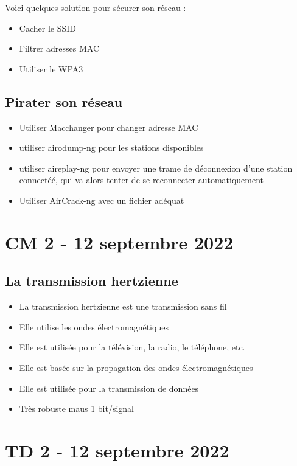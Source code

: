 \documentclass[12pt, a4paper]{article}
\begin{document}
Voici quelques solution pour sécurer son réseau : \\
\begin{itemize}
    \item Cacher le SSID
    \item Filtrer adresses MAC
    \item Utiliser le WPA3
\end{itemize}

\subsection{Pirater son réseau}
\begin{itemize}
    \item Utiliser Macchanger pour changer adresse MAC
    \item utiliser airodump-ng pour les stations disponibles
    \item utiliser aireplay-ng pour envoyer une trame de déconnexion d'une station connectéé, qui va alors tenter de se reconnecter automatiquement
    \item Utiliser AirCrack-ng avec un fichier adéquat
\end{itemize}
\newpage

\section{CM 2 - 12 septembre 2022}
\subsection{La transmission hertzienne}
\begin{itemize}
    \item La transmission hertzienne est une transmission sans fil
    \item Elle utilise les ondes électromagnétiques
    \item Elle est utilisée pour la télévision, la radio, le téléphone, etc.
    \item Elle est basée sur la propagation des ondes électromagnétiques
    \item Elle est utilisée pour la transmission de données
    \item Très robuste maus 1 bit/signal
\end{itemize}


\newpage
\section{TD 2 - 12 septembre 2022}
\end{document}
